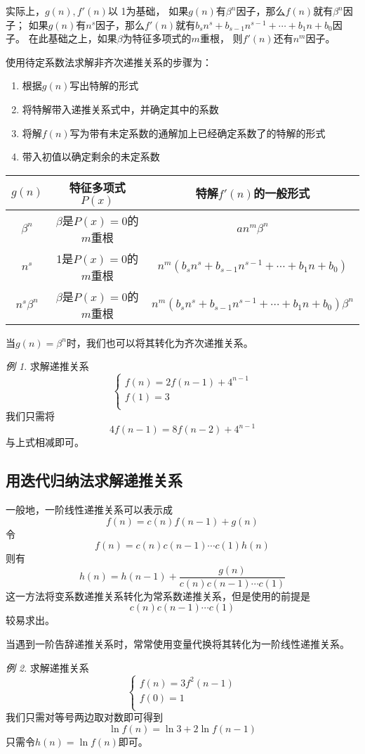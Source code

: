 \documentclass[a4paper,11pt]{article}%
\theoremstyle{remark}
\theoremstyle{remark}
\newtheorem*{example}{例}
\theoremstyle{definition}
\theoremstyle{definition}
\theoremstyle{definition}
\begin{document}
实际上，$g(n),f'(n)$以 1为基础， 如果$g(n)$有$\beta^n$因子，那么$f(n)$就有$\beta^n$因子；
如果$g(n)$有$n^s$因子，那么$f'(n)$就有$b_sn^s+b_{s-1}n^{s-1}+\cdots+b_1n+b_0$因子。 在此基础之上，如果$\beta$为特征多项式的$m$重根， 
则$f'(n)$还有$n^m$因子。

使用待定系数法求解非齐次递推关系的步骤为：
\begin{enumerate}
    \item 根据$g(n)$写出特解的形式
    \item 将特解带入递推关系式中，并确定其中的系数
    \item 将解$f(n)$写为带有未定系数的通解加上已经确定系数了的特解的形式
    \item 带入初值以确定剩余的未定系数
\end{enumerate}
\begin{table}[h]
    \begin{center}
        \begin{tabular}{c|c|c}$ g(n)$&特征多项式$P(x)$&特解$f'(n)$的一般形式\\
       \hline$\beta^n$&$\beta$是$P(x)=0$的$m$重根&$an^m\beta^n$\\$n^s$& 1是$P(x)=0$的$m$重根&$n^m(b_sn^s+b_{s-1}n^{s-1}+\cdots+b_1n+b_0)$\\$n^s\beta^n$ &$\beta$是$P(x)=0$的$m$重根&$n^m(b_sn^s+b_{s-1}n^{s-1}+\cdots+b_1n+b_0)\beta^n$\\
        \end{tabular}
    \end{center}
\end{table}
当$g(n)=\beta^n$时，我们也可以将其转化为齐次递推关系。
\begin{example}
求解递推关系 \[
\begin{cases}
    f(n)=2f(n-1)+4^{n-1}\\
    f(1)=3\\
\end{cases}    \]
我们只需将 
\[4f(n-1)=8f(n-2)+4^{n-1}\]
与上式相减即可。
\end{example}
\subsection{用迭代归纳法求解递推关系}
一般地，一阶线性递推关系可以表示成
\[f(n)=c(n)f(n-1)+g(n)\]
令 
\[f(n)=c(n)c(n-1)\cdots c(1)h(n)\]
则有 
\[h(n)=h(n-1)+\frac{g(n)}{c(n)c(n-1)\cdots c(1)}\]
这一方法将变系数递推关系转化为常系数递推关系，但是使用的前提是 
\[c(n)c(n-1)\cdots c(1)\]
较易求出。

当遇到一阶告辞递推关系时，常常使用变量代换将其转化为一阶线性递推关系。
\begin{example}
求解递推关系 \[
\begin{cases}
    f(n)=3f^2(n-1)\\
    f(0)=1\\
\end{cases}    \]
我们只需对等号两边取对数即可得到 
\[\ln f(n)=\ln 3+2\ln f(n-1)\]
只需令$h(n)=\ln f(n)$即可。
\end{example}
\end{document}
